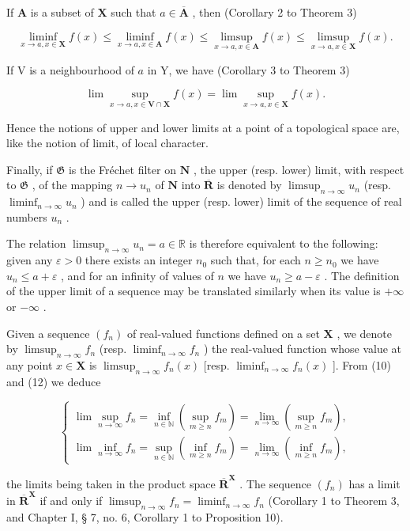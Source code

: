 If \(\mathbf{A}\) is a subset of \(\mathbf{X}\) such that \(a \in \overline{\mathbf{A}}\) , then (Corollary 2 to Theorem 3)

\[
\liminf _ {x \to a, x \in \mathbf {X}} f (x) \leqslant \liminf _ {x \to a, x \in \mathbf {A}} f (x) \leqslant \limsup _ {x \to a, x \in \mathbf {A}} f (x) \leqslant \limsup _ {x \to a, x \in \mathbf {X}} f (x).
\]

If V is a neighbourhood of \(a\) in Y, we have (Corollary 3 to Theorem 3)

\[
\lim \sup _ {x \to a, x \in \mathbf {V} \cap \mathbf {X}} f (x) = \lim \sup _ {x \to a, x \in \mathbf {X}} f (x).
\]

Hence the notions of upper and lower limits at a point of a topological space are, like the notion of limit, of local character.

Finally, if \(\mathfrak{G}\) is the Fréchet filter on \(\mathbf{N}\) , the upper (resp. lower) limit, with respect to \(\mathfrak{G}\) , of the mapping \(n \to u_n\) of \(\mathbf{N}\) into \(\overline{\mathbf{R}}\) is denoted by \(\limsup_{n \to \infty} u_n\) (resp. \(\liminf_{n \to \infty} u_n\) ) and is called the upper (resp. lower) limit of the sequence of real numbers \(u_n\) .

The relation \(\limsup_{n\to \infty}u_n = a\in \mathbb{R}\) is therefore equivalent to the following: given any \(\varepsilon >0\) there exists an integer \(n_0\) such that, for each \(n\geqslant n_0\) we have \(u_{n}\leqslant a + \varepsilon\) , and for an infinity of values of \(n\) we have \(u_{n}\geqslant a - \varepsilon\) . The definition of the upper limit of a sequence may be translated similarly when its value is \(+\infty\) or \(-\infty\) .

Given a sequence \((f_n)\) of real-valued functions defined on a set \(\mathbf{X}\) , we denote by \(\limsup_{n\to \infty}f_n\) (resp. \(\liminf_{n\to \infty} f_n\) ) the real-valued function whose value at any point \(x\in \mathbf{X}\) is \(\limsup_{n\to \infty}f_n(x)\) {[}resp. \(\liminf_{n\to \infty} f_n(x)\) {]}. From (10) and (12) we deduce

\[
\left\{\begin{array}{l}\lim \sup _ {n \rightarrow \infty} f _ {n} = \inf _ {n \in \mathbb {N}} (\sup _ {m \geqslant n} f _ {m}) = \lim _ {n \rightarrow \infty} (\sup _ {m \geqslant n} f _ {m}),\\\lim \inf _ {n \rightarrow \infty} f _ {n} = \sup _ {n \in \mathbb {N}} (\inf _ {m \geqslant n} f _ {m}) = \lim _ {n \rightarrow \infty} (\inf _ {m \geqslant n} f _ {m}),\end{array}\right.\tag{16}
\]

the limits being taken in the product space \(\overline{\mathbf{R}}^{\mathbf{X}}\) . The sequence \((f_n)\) has a limit in \(\overline{\mathbf{R}}^{\mathbf{X}}\) if and only if \(\limsup_{n\to\infty}f_n=\liminf_{n\to\infty}f_n\) (Corollary 1 to Theorem 3, and Chapter I, § 7, no. 6, Corollary 1 to Proposition 10).

